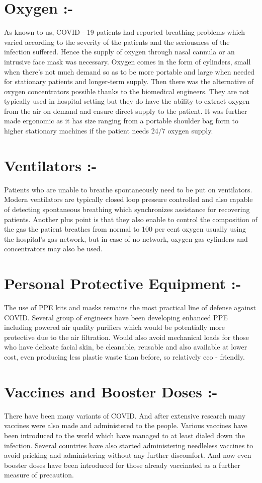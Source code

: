 \documentclass[12pt]{article}
\begin{document}
\section{Oxygen :-}
\begin{Large}
As known to us, COVID - 19 patients had reported breathing problems which varied according to the severity of the patients and the seriousness of the infection suffered. Hence the supply of oxygen through nasal cannula or an intrusive face mask was necessary. Oxygen comes in the form of cylinders, small when there's not much demand so as to be more portable and large when needed for stationary patients and longer-term supply. Then there was the alternative of oxygen concentrators possible thanks to the biomedical engineers. They are not typically used in hospital setting but they do have the ability to extract oxygen from the air on demand and ensure direct supply to the patient. It was further made ergonomic as it has size ranging from a portable shoulder bag form to higher stationary machines if the patient needs 24/7 oxygen supply.

\section{Ventilators :-}
Patients who are unable to breathe spontaneously need to be put on ventilators. Modern ventilators are typically closed loop pressure controlled and also capable of detecting spontaneous breathing which synchronizes assistance for recovering patients. Another plus point is that they also enable to control the composition of the gas the patient breathes from normal to 100 per cent oxygen usually using the hospital's gas network, but in case of no network, oxygen gas cylinders and concentrators may also be used.

\section{Personal Protective Equipment :-}
The use of PPE kits and masks remains the most practical line of defense against COVID. Several group of engineers have been developing enhanced PPE including powered air quality purifiers which would be potentially more protective due to the air filtration. Would also avoid mechanical loads for those who have delicate facial skin, be cleanable, reusable and also available at lower cost, even producing less plastic waste than before, so relatively eco - friendly. 

\section{Vaccines and Booster Doses :- }
There have been many variants of COVID. And after extensive research many vaccines were also made and administered to the people. Various vaccines have been introduced to the world which have managed to at least dialed down the infection. Several countries have also started administering needleless vaccines to avoid pricking and administering without any further discomfort. And now even booster doses have been introduced for those already vaccinated as a further measure of precaution.


\end{Large}
\end{document}
